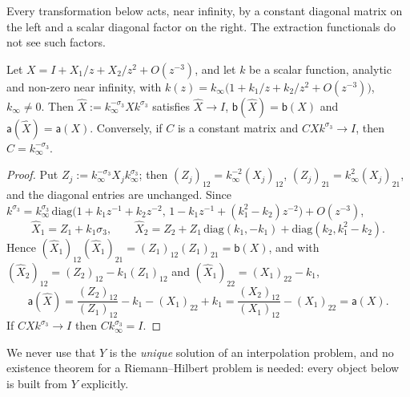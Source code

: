 Every transformation below acts, near infinity, by a constant diagonal matrix on the left and a scalar diagonal
factor on the right. The extraction functionals do not see such factors.

\begin{lemma}\label{lem:invariance}
Let $X=I+X_1/z+X_2/z^2+O(z^{-3})$, and let $k$ be a scalar function, analytic and non-zero near infinity, with
$k(z)=k_\infty\bigl(1+k_1/z+k_2/z^2+O(z^{-3})\bigr)$, $k_\infty\ne0$. Then $\hat X:=k_\infty^{-\sigma_3}Xk^{\sigma_3}$
satisfies $\hat X\to I$, $\mathsf b(\hat X)=\mathsf b(X)$ and $\mathsf a(\hat X)=\mathsf a(X)$. Conversely, if $C$ is a
constant matrix and $CXk^{\sigma_3}\to I$, then $C=k_\infty^{-\sigma_3}$.
\end{lemma}

\begin{proof}
Put $Z_j:=k_\infty^{-\sigma_3}X_jk_\infty^{\sigma_3}$; then $(Z_j)_{12}=k_\infty^{-2}(X_j)_{12}$,
$(Z_j)_{21}=k_\infty^2(X_j)_{21}$, and the diagonal entries are unchanged. Since
$k^{\sigma_3}=k_\infty^{\sigma_3}\,\mathrm{diag}\bigl(1+k_1z^{-1}+k_2z^{-2},\,1-k_1z^{-1}+(k_1^2-k_2)z^{-2}\bigr)+O(z^{-3})$,
\[
  \hat X_1=Z_1+k_1\sigma_3,\qquad \hat X_2=Z_2+Z_1\,\mathrm{diag}(k_1,-k_1)+\mathrm{diag}(k_2,k_1^2-k_2).
\]
Hence $(\hat X_1)_{12}(\hat X_1)_{21}=(Z_1)_{12}(Z_1)_{21}=\mathsf b(X)$, and with $(\hat X_2)_{12}=(Z_2)_{12}-k_1(Z_1)_{12}$
and $(\hat X_1)_{22}=(X_1)_{22}-k_1$,
\[
  \mathsf a(\hat X)=\frac{(Z_2)_{12}}{(Z_1)_{12}}-k_1-(X_1)_{22}+k_1=\frac{(X_2)_{12}}{(X_1)_{12}}-(X_1)_{22}=\mathsf a(X).
\]
If $CXk^{\sigma_3}\to I$ then $Ck_\infty^{\sigma_3}=I$.
\end{proof}

We never use that $Y$ is the \emph{unique} solution of an interpolation problem, and no existence theorem for a
Riemann--Hilbert problem is needed: every object below is built from $Y$ explicitly.

